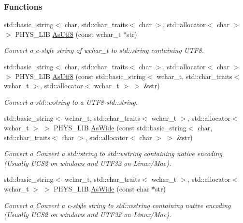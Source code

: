 \subsubsection*{Functions}
\begin{DoxyCompactItemize}
\item 
std::basic\_\-string$<$ char, std::char\_\-traits$<$ char $>$, std::allocator$<$ char $>$ $>$ PHYS\_\-LIB \hyperlink{namespacephys_1_1xml_a2d4bf28045544dc7350827f568cad46f}{AsUtf8} (const wchar\_\-t $\ast$str)
\begin{DoxyCompactList}\small\item\em Convert a c-\/style string of wchar\_\-t to std::string containing UTF8. \item\end{DoxyCompactList}\item 
std::basic\_\-string$<$ char, std::char\_\-traits$<$ char $>$, std::allocator$<$ char $>$ $>$ PHYS\_\-LIB \hyperlink{namespacephys_1_1xml_aa3d160a2965f60bc3b2f019be6c7d038}{AsUtf8} (const std::basic\_\-string$<$ wchar\_\-t, std::char\_\-traits$<$ wchar\_\-t $>$, std::allocator$<$ wchar\_\-t $>$ $>$ \&str)
\begin{DoxyCompactList}\small\item\em Convert a std::wstring to a UTF8 std::string. \item\end{DoxyCompactList}\item 
std::basic\_\-string$<$ wchar\_\-t, std::char\_\-traits$<$ wchar\_\-t $>$, std::allocator$<$ wchar\_\-t $>$ $>$ PHYS\_\-LIB \hyperlink{namespacephys_1_1xml_a7ca79461d40476ea4cde4f54dadffff4}{AsWide} (const std::basic\_\-string$<$ char, std::char\_\-traits$<$ char $>$, std::allocator$<$ char $>$ $>$ \&str)
\begin{DoxyCompactList}\small\item\em Convert a Convert a std::string to std::wstring containing native encoding (Usually UCS2 on windows and UTF32 on Linux/Mac). \item\end{DoxyCompactList}\item 
std::basic\_\-string$<$ wchar\_\-t, std::char\_\-traits$<$ wchar\_\-t $>$, std::allocator$<$ wchar\_\-t $>$ $>$ PHYS\_\-LIB \hyperlink{namespacephys_1_1xml_a0a57ef612f499a03733ca18d0e4f0c4f}{AsWide} (const char $\ast$str)
\begin{DoxyCompactList}\small\item\em Convert a Convert a c-\/style string to std::wstring containing native encoding (Usually UCS2 on windows and UTF32 on Linux/Mac). \item\end{DoxyCompactList}\item 

\end{DoxyCompactItemize}
